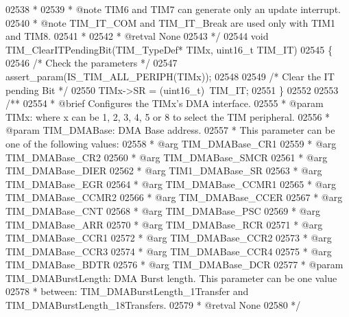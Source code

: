 \begin{DoxyCode}
02538 \textcolor{comment}{  *}
02539 \textcolor{comment}{  * @note   TIM6 and TIM7 can generate only an update interrupt.}
02540 \textcolor{comment}{  * @note   TIM\_IT\_COM and TIM\_IT\_Break are used only with TIM1 and TIM8.}
02541 \textcolor{comment}{  *      }
02542 \textcolor{comment}{  * @retval None}
02543 \textcolor{comment}{  */}
02544 \textcolor{keywordtype}{void} TIM_ClearITPendingBit(TIM\_TypeDef* TIMx, uint16\_t TIM\_IT)
02545 \{
02546   \textcolor{comment}{/* Check the parameters */}
02547   assert_param(IS\_TIM\_ALL\_PERIPH(TIMx));
02548 
02549   \textcolor{comment}{/* Clear the IT pending Bit */}
02550   TIMx->SR = (uint16\_t)~TIM\_IT;
02551 \}
02552 
02553 \textcolor{comment}{/**}
02554 \textcolor{comment}{  * @brief  Configures the TIMx's DMA interface.}
02555 \textcolor{comment}{  * @param  TIMx: where x can be 1, 2, 3, 4, 5 or 8 to select the TIM peripheral.}
02556 \textcolor{comment}{  * @param  TIM\_DMABase: DMA Base address.}
02557 \textcolor{comment}{  *          This parameter can be one of the following values:}
02558 \textcolor{comment}{  *            @arg TIM\_DMABase\_CR1  }
02559 \textcolor{comment}{  *            @arg TIM\_DMABase\_CR2}
02560 \textcolor{comment}{  *            @arg TIM\_DMABase\_SMCR}
02561 \textcolor{comment}{  *            @arg TIM\_DMABase\_DIER}
02562 \textcolor{comment}{  *            @arg TIM1\_DMABase\_SR}
02563 \textcolor{comment}{  *            @arg TIM\_DMABase\_EGR}
02564 \textcolor{comment}{  *            @arg TIM\_DMABase\_CCMR1}
02565 \textcolor{comment}{  *            @arg TIM\_DMABase\_CCMR2}
02566 \textcolor{comment}{  *            @arg TIM\_DMABase\_CCER}
02567 \textcolor{comment}{  *            @arg TIM\_DMABase\_CNT   }
02568 \textcolor{comment}{  *            @arg TIM\_DMABase\_PSC   }
02569 \textcolor{comment}{  *            @arg TIM\_DMABase\_ARR}
02570 \textcolor{comment}{  *            @arg TIM\_DMABase\_RCR}
02571 \textcolor{comment}{  *            @arg TIM\_DMABase\_CCR1}
02572 \textcolor{comment}{  *            @arg TIM\_DMABase\_CCR2}
02573 \textcolor{comment}{  *            @arg TIM\_DMABase\_CCR3  }
02574 \textcolor{comment}{  *            @arg TIM\_DMABase\_CCR4}
02575 \textcolor{comment}{  *            @arg TIM\_DMABase\_BDTR}
02576 \textcolor{comment}{  *            @arg TIM\_DMABase\_DCR}
02577 \textcolor{comment}{  * @param  TIM\_DMABurstLength: DMA Burst length. This parameter can be one value}
02578 \textcolor{comment}{  *         between: TIM\_DMABurstLength\_1Transfer and TIM\_DMABurstLength\_18Transfers.}
02579 \textcolor{comment}{  * @retval None}
02580 \textcolor{comment}{  */}

\end{DoxyCode}
